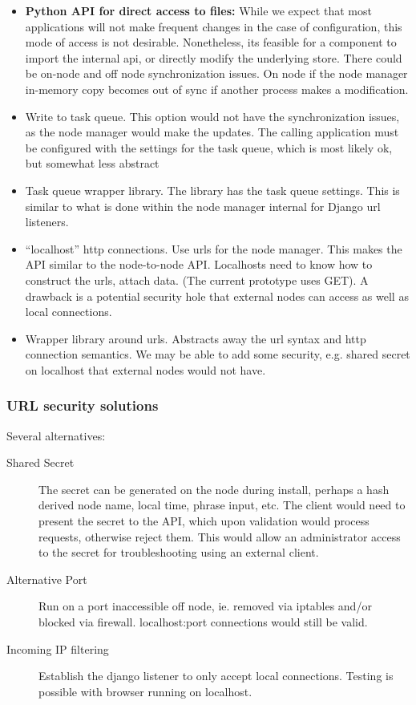 \documentclass[oneside,12pt]{memoir}
\begin{document}
\begin{itemize}
\item \textbf{Python API for direct access to files:}  While we expect that most applications will not make frequent changes in the case of configuration, this mode of access is not desirable.  Nonetheless, its feasible for a component to import the internal api, or directly modify the underlying store.  There could be on-node and off node synchronization issues.  On node if the node manager in-memory copy becomes out of sync if another process makes a modification.  
\item Write to task queue. This option would not have the synchronization issues, as the node manager would make the updates.  The calling application must be configured with the settings for the task queue, which is most likely ok, but somewhat less abstract
\item Task queue wrapper library.  The library has the task queue settings.  This is similar to what is done within the node manager internal for Django url listeners.
\item ``localhost'' http connections.  Use urls for the node manager.  This makes the API similar to the node-to-node API.   Localhosts need to know how to construct the urls, attach data. (The current prototype uses GET).  A drawback is a potential security hole that external nodes can access as well as local connections. 
\item Wrapper library around urls.  Abstracts away the url syntax and http connection semantics.  We may be able to add some security, e.g. shared secret on localhost that external nodes would not have.

\end{itemize}

\subsubsection{URL security solutions}

Several alternatives:

\begin{description}

\item[Shared Secret] The secret can be generated on the node during install, perhaps a hash derived node name, local time, phrase input, etc.  The client would need to present the secret to the API, which upon validation would process  requests, otherwise reject them.  This would allow an administrator access to the secret for troubleshooting using an external client.
\item[Alternative Port]  Run on a port inaccessible off node, ie. removed via iptables and/or blocked via firewall.  localhost:port connections would still be valid.  
\item[Incoming IP filtering]  Establish the django listener to only accept local connections.  Testing is possible with browser running on localhost.

\end{description}
\end{document}
